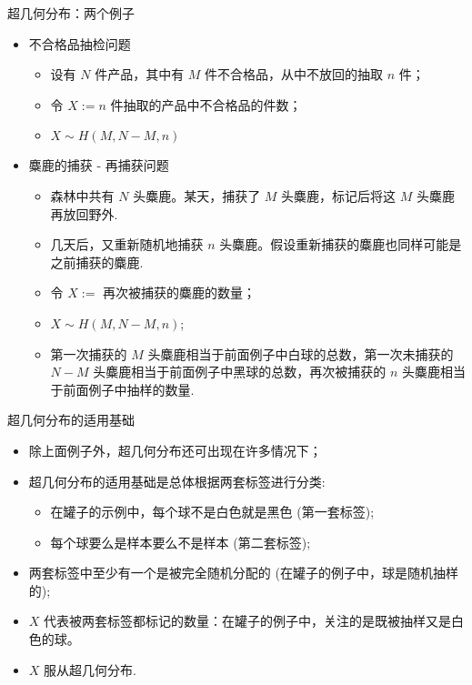 \begin{frame}{超几何分布：两个例子}
	\begin{itemize}[<+-|alert@+>]
		\item 不合格品抽检问题
		      \begin{itemize}[<+-|alert@+>]
			      \item 设有 $N$ 件产品，其中有 $M$ 件不合格品，从中不放回的抽取 $n$ 件；
			      \item 令 $X:=n$ 件抽取的产品中不合格品的件数；
			      \item $X\sim H(M,N-M,n)$
		      \end{itemize}
		\item 麋鹿的捕获 - 再捕获问题
		      \begin{itemize}[<+-|alert@+>]
			      \item 森林中共有 $N$ 头麋鹿。某天，捕获了 $M$ 头麋鹿，标记后将这 $M$ 头麋鹿再放回野外.
			      \item 几天后，又重新随机地捕获 $n$ 头麋鹿。假设重新捕获的麋鹿也同样可能是之前捕获的麋鹿.
			      \item 令 $X:=$ 再次被捕获的麋鹿的数量；
			      \item $X\sim H(M,N-M,n)$;
			      \item 第一次捕获的 $M$ 头麋鹿相当于前面例子中白球的总数，第一次未捕获的 $N-M$ 头麋鹿相当于前面例子中黑球的总数，再次被捕获的 $n$ 头麋鹿相当于前面例子中抽样的数量.
		      \end{itemize}
	\end{itemize}
\end{frame}




\begin{frame}{超几何分布的适用基础}
	\begin{itemize}[<+-|alert@+>]
		\item 除上面例子外，超几何分布还可出现在许多情况下；
		\item 超几何分布的适用基础是总体根据两套标签进行分类:
		      \begin{itemize}[<+-|alert@+>]
			      \item 在罐子的示例中，每个球不是白色就是黑色 (第一套标签);
			      \item 每个球要么是样本要么不是样本 (第二套标签);
		      \end{itemize}
		\item 两套标签中至少有一个是被完全随机分配的 (在罐子的例子中，球是随机抽样的);
		\item $X$ 代表被两套标签都标记的数量：在罐子的例子中，关注的是既被抽样又是白色的球。
		\item $X$ 服从超几何分布.
	\end{itemize}
\end{frame}


